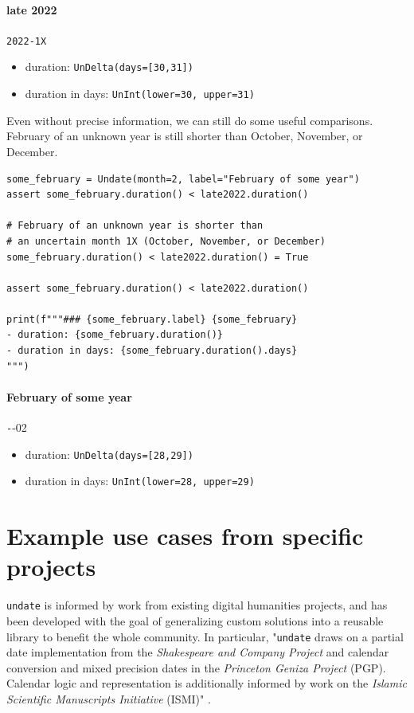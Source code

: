 \documentclass{anthology-ch}         %
\begin{document}
\paragraph{late 2022} \texttt{2022-1X}
\begin{itemize}
    \item duration: \texttt{UnDelta(days=[30,31])}
    \item duration in days: \texttt{UnInt(lower=30, upper=31)}
\end{itemize}
    
    
Even without precise information, we can still do some useful comparisons. February of an unknown year is still shorter than October, November, or December.

\begin{verbatim}
some_february = Undate(month=2, label="February of some year")
assert some_february.duration() < late2022.duration()

# February of an unknown year is shorter than 
# an uncertain month 1X (October, November, or December) 
some_february.duration() < late2022.duration() = True

assert some_february.duration() < late2022.duration()

print(f"""### {some_february.label} {some_february}
- duration: {some_february.duration()}
- duration in days: {some_february.duration().days}
""")

\end{verbatim}

\paragraph{February of some year} \texttt{-}{-02}
\begin{itemize}
    \item duration: \texttt{UnDelta(days=[28,29])}
    \item duration in days: \texttt{UnInt(lower=28, upper=29)}
\end{itemize}
    
\section{Example use cases from specific projects}\label{example-use-cases-from-specific-projects}

\texttt{undate} is informed by work from existing digital humanities projects, and has been developed with the goal of generalizing custom solutions into a reusable library to benefit the whole community. In particular, "\texttt{undate} draws on a partial date implementation from the \textit{Shakespeare and Company Project} and calendar conversion and mixed
precision dates in the \textit{Princeton Geniza Project} (PGP). Calendar
logic and representation is additionally informed by work on
the \textit{Islamic Scientific Manuscripts Initiative} (ISMI)" \cite{koeser_princeton_2025}.
\end{document}

